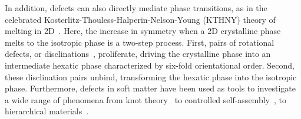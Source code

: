 In addition, defects can also directly mediate phase transitions, as in the celebrated Kosterlitz-Thouless-Halperin-Nelson-Young (KTHNY) theory of melting in 2D~\cite{RN161,RN162,RN163}.
Here, the increase in symmetry when a 2D crystalline phase melts to the isotropic phase is a two-step process.
First, pairs of rotational defects, or disclinations~\cite{RN61,RN203}, proliferate, driving the crystalline phase into an intermediate hexatic phase characterized by six-fold orientational order.
Second, these disclination pairs unbind, transforming the hexatic phase into the isotropic phase.
Furthermore, defects in soft matter have been used as tools to investigate a wide range of phenomena from knot theory~\cite{RN156,RN277} to controlled self-assembly~\cite{RN43,RN50,RN150,RN157}, to hierarchical materials~\cite{RN164,RN159,RN27}.

